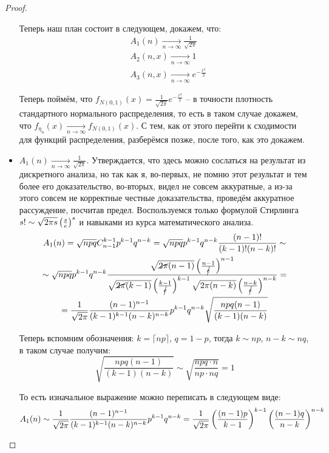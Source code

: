 \begin{proof}
\begin{itemize}
        Теперь наш план состоит в следующем, докажем, что:
        \begin{align*}
            & A_1(n) \xrightarrow[n \to \infty]{} \frac{1}{\sqrt{2\pi}}
            \\
            & A_2(n, x) \xrightarrow[n \to \infty]{} 1
            \\
            & A_3(n, x) \xrightarrow[n \to \infty]{} e^{-\frac{x^2}{2}}
        \end{align*}

        Теперь поймём, что $f_{N(0,1)}(x) = \frac{1}{\sqrt{2\pi}} e^{-\frac{x^2}{2}}$ -- в точности плотность стандартного нормального распределения, то есть в таком случае докажем, что $f_{\eta_n}(x) \xrightarrow[n \to \infty]{} f_{N(0,1)}(x)$. С тем, как от этого перейти к сходимости для функций распределения, разберёмся позже, после того, как это докажем.

        \item $A_1(n) \xrightarrow[n \to \infty]{} \frac{1}{\sqrt{2\pi}}$. Утверждается, что здесь можно сослаться на результат из дискретного анализа, но так как я, во-первых, не помню этот результат и тем более его доказательство, во-вторых, видел не совсем аккуратные, а из-за этого совсем не корректные честные доказательства, проведём аккуратное рассуждение, посчитав предел. Воспользуемся только формулой Стирлинга $s! \sim \sqrt{2\pi s}\left(\frac{s}{e}\right)^s$ и навыками из курса математического анализа.
        \begin{multline*}
            A_1(n) = \sqrt{npq} C_{n-1}^{k-1} p^{k-1} q^{n-k} = \sqrt{npq} p^{k-1} q^{n-k} \frac{(n-1)!}{(k-1)!(n-k)!} \sim
            \\
            \sim \sqrt{npq} p^{k-1} q^{n-k} \frac{\sqrt{\cancel{2\pi} (n-1)}\left(\frac{n-1}{\cancel{e}}\right)^{n-1}}{\sqrt{\cancel{2\pi} (k-1)}\left(\frac{k-1}{\cancel{e}}\right)^{k-1} \sqrt{2\pi (n-k)}\left(\frac{n-k}{\cancel{e}}\right)^{n-k}} =
            \\
            = \frac{1}{\sqrt{2 \pi}} \frac{(n-1)^{n-1}}{(k-1)^{k-1} (n-k)^{n-k}} p^{k-1} q^{n-k} \sqrt{\frac{npq(n-1)}{(k-1)(n-k)}}
        \end{multline*}

        Теперь вспомним обозначения: $k = \lceil np \rceil$, $q = 1-p$, тогда $k \sim np$, $n-k \sim nq$, в таком случае получим:
        \[
            \sqrt{\frac{npq(n-1)}{(k-1)(n-k)}} \sim \sqrt{\frac{npq \cdot n}{np \cdot nq}} = 1
        \]

        То есть изначальное выражение можно переписать в следующем виде:
        \[
            A_1(n) \sim \frac{1}{\sqrt{2 \pi}} \frac{(n-1)^{n-1}}{(k-1)^{k-1} (n-k)^{n-k}} p^{k-1} q^{n-k} = \frac{1}{\sqrt{2 \pi}} \left(\frac{(n-1)p}{k-1}\right)^{k-1} \left(\frac{(n-1)q}{n-k}\right)^{n-k}
        \]


\end{itemize}
\end{proof}
